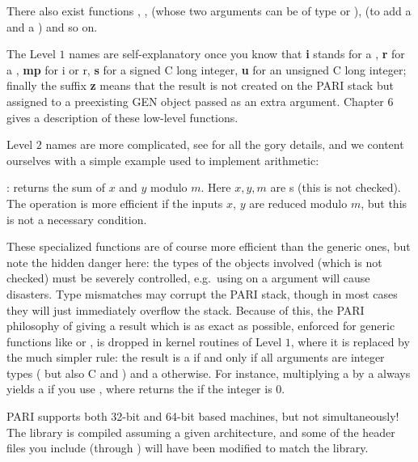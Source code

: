 \noindent
There also exist functions , ,  (whose
two arguments can be of type  or ),  (to add a
 and a ) and so on.

The Level $1$ names are self-explanatory once you know that {\bf i} stands for a
, {\bf r} for a , {\bf mp} for i or r, {\bf s} for a signed C
long integer, {\bf u} for an unsigned C long integer; finally the suffix {\bf z}
means that the result is not created on the PARI stack but assigned to a
preexisting GEN object passed as an extra argument. Chapter 6 gives a description
of these low-level functions.

Level $2$ names are more complicated, see  for all the
gory details, and we content ourselves with a simple example used to implement
 arithmetic:

: returns the sum of $x$ and $y$
modulo $m$. Here $x, y, m$ are s (this is not checked). The operation
is more efficient if the inputs $x$, $y$ are reduced modulo $m$, but this is not a
necessary condition.

 These specialized functions are of course more
efficient than the generic ones, but note the hidden danger here: the types of the
objects involved (which is not checked) must be severely controlled, e.g.~using
 on a  argument will cause disasters. Type mismatches may
corrupt the PARI stack, though in most cases they will just immediately overflow
the stack. Because of this, the PARI philosophy of giving a result which is as
exact as possible, enforced for generic functions like  or ,
is dropped in kernel routines of Level $1$, where it is replaced by the much
simpler rule: the result is a  if and only if all arguments
are integer types ( but also C  and ) and a
 otherwise. For instance, multiplying a  by a 
always yields a  if you use , where  returns the
  if the integer is $0$.


\noindent
PARI supports both 32-bit and 64-bit based machines, but not simultaneously!
The library is compiled assuming a given architecture, and some
of the header files you include (through ) will have been
modified to match the library.

